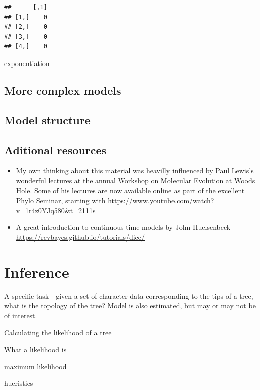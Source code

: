 \documentclass[
]{book}
\begin{document}
\begin{verbatim}
##      [,1]
## [1,]    0
## [2,]    0
## [3,]    0
## [4,]    0
\end{verbatim}

exponentiation

\hypertarget{more-complex-models}{%
\section{More complex models}\label{more-complex-models}}

\hypertarget{model-structure}{%
\section{Model structure}\label{model-structure}}

\hypertarget{aditional-resources}{%
\section{Aditional resources}\label{aditional-resources}}

\begin{itemize}
\item
  My own thinking about this material was heavilly influenced by Paul Lewis's wonderful lectures at the annual Workshop on Molecular Evolution at Woods Hole. Some of his lectures are now available online as part of the excellent \href{https://www.youtube.com/channel/UCbAzhfySv7nLCrNYqZvBSMg}{Phylo Seminar}, starting with \url{https://www.youtube.com/watch?v=1r4z0YJq580\&t=2111s}
\item
  A great introduction to continuous time models by John Huelsenbeck \url{https://revbayes.github.io/tutorials/dice/}
\end{itemize}

\hypertarget{inference}{%
\chapter{Inference}\label{inference}}

A specific task - given a set of character data corresponding to the tips of a tree, what is the topology of the tree? Model is also estimated, but may or may not be of interest.

Calculating the likelihood of a tree

What a likelihood is

maximum likelihood

hueristics
\end{document}
